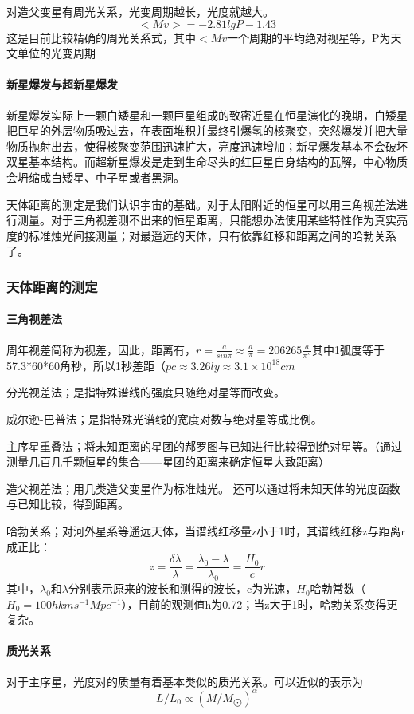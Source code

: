 \documentclass[%
 reprint,
 amsmath,amssymb,
 aps,
]{revtex4-1}
\begin{document}
对造父变星有周光关系，光变周期越长，光度就越大。$$<Mv> = -2.81lgP - 1.43$$这是目前比较精确的周光关系式，其中$<Mv
$一个周期的平均绝对视星等，P为天文单位的光变周期

\paragraph{新星爆发与超新星爆发}新星爆发实际上一颗白矮星和一颗巨星组成的致密近星在恒星演化的晚期，白矮星把巨星的外层物质吸过去，在表面堆积并最终引爆氢的核聚变，突然爆发并把大量物质抛射出去，使得核聚变范围迅速扩大，亮度迅速增加；新星爆发基本不会破坏双星基本结构。而超新星爆发是走到生命尽头的红巨星自身结构的瓦解，中心物质会坍缩成白矮星、中子星或者黑洞。

天体距离的测定是我们认识宇宙的基础。对于太阳附近的恒星可以用三角视差法进行测量。对于三角视差测不出来的恒星距离，只能想办法使用某些特性作为真实亮度的标准烛光间接测量；对最遥远的天体，只有依靠红移和距离之间的哈勃关系了。

\subsubsection{天体距离的测定}
\paragraph{三角视差法}周年视差简称为视差，因此，距离有，$r = \frac{a}{sin\pi} \approx \frac{a}{\pi} = 206265\frac{a}{\pi''} $其中1弧度等于57.3*60*60角秒，所以1秒差距（$pc \approx 3.26 ly \approx 3.1\times10^{18} cm$

分光视差法；是指特殊谱线的强度只随绝对星等而改变。

威尔逊-巴普法；是指特殊光谱线的宽度对数与绝对星等成比例。

主序星重叠法；将未知距离的星团的郝罗图与已知进行比较得到绝对星等。（通过测量几百几千颗恒星的集合——星团的距离来确定恒星大致距离）

造父视差法；用几类造父变星作为标准烛光。
还可以通过将未知天体的光度函数与已知比较，得到距离。

哈勃关系；对河外星系等遥远天体，当谱线红移量z小于1时，其谱线红移z与距离r成正比：$$z = \frac{ \delta \lambda}{\lambda} = \frac{\lambda_0 - \lambda}{\lambda_0} = \frac{H_0}{c}r$$其中，$\lambda_0$和$\lambda$分别表示原来的波长和测得的波长，c为光速，$H_0$哈勃常数（$H_0 = 100 h km s^{-1} Mpc^{-1}$），目前的观测值h为0.72；当z大于1时，哈勃关系变得更复杂。

\paragraph{质光关系}对于主序星，光度对的质量有着基本类似的质光关系。可以近似的表示为$$L/L_0 \propto(M/M_{\bigodot})^{\alpha} $$
\end{document}
